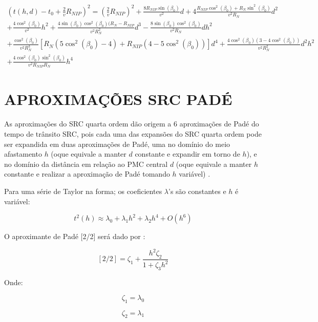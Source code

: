 \begin{multline}
\label{eq:3.13}
(t(h,d)-t_0+\frac{2}{v}R_{NIP})^2=(\frac{2}{v}R_{NIP})^2+\frac{8R_{NIP}\sin(\beta_0)}{v^2}d+4\frac{R_{NIP}\cos^2(\beta_0)+R_N\sin^2(\beta_0)}{v^2R_N}d^2 \\
+\frac{4\cos^2(\beta_0)}{v^2}h^2+\frac{4\sin(\beta_0)\cos^2(\beta_0)(R_N-R_{NIP}}{v^2R_N^2}d^3-\frac{8\sin(\beta_0)\cos^2(\beta_0)}{v^2R_N}dh^2 \\
+\frac{\cos^2(\beta_0)}{v^2R_N^3}[R_N(5\cos^2(\beta_0)-4)+R_{NIP}(4-5\cos^2(\beta_0))]d^4+\frac{4\cos^2(\beta_0)(3-4\cos^2(\beta_0))}{v^2R_N^2}d^2h^2 \\
+\frac{4\cos^2(\beta_0)\sin^2(\beta_0)}{v^2R_{NIP}R_N}h^4
\end{multline}


\section{APROXIMAÇÕES SRC PADÉ}

As aproximações do SRC quarta ordem dão origem a 6 aproximações de Padé do tempo de trânsito SRC, pois
cada uma das expansões do SRC quarta ordem pode ser expandida em duas aproximações de Padé, uma
no domínio do meio afastamento $h$ (oque equivale a manter $d$ constante e expandir em torno de $h$), e
no domínio da distância em relação ao PMC central $d$ (oque equivale a manter $h$ constante e 
realizar a aproximação de Padé tomando $h$ variável) \cite{neves}.

Para uma série de Taylor na forma; 
os coeficientes $\lambda$'s são constantes e $h$ é variável:

\begin{equation} %
\label{eq:3.14}
t^2(h) \approx \lambda_0+\lambda_1h^2+\lambda_2h^4+O(h^6)
\end{equation}

O aproximante de Padé [2/2] será dado por \cite{neves}:

\begin{equation} %
\label{eq:3.15}
 [2/2]=\zeta_1+\frac{h^2\zeta_2}{1+\zeta_3h^2}
\end{equation}

Onde:

\begin{equation}
\label{eq:3.16}
 \zeta_1=\lambda_0 
\end{equation}

\begin{equation}
\label{eq:3.17}
 \zeta_2=\lambda_1
\end{equation}

